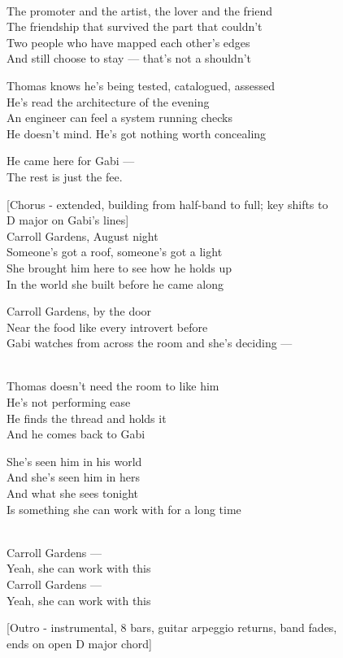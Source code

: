 \begin{lyrics}
\\
The promoter and the artist, the lover and the friend\\
The friendship that survived the part that couldn't\\
Two people who have mapped each other's edges\\
And still choose to stay — that's not a shouldn't

Thomas knows he's being tested, catalogued, assessed\\
He's read the architecture of the evening\\
An engineer can feel a system running checks\\
He doesn't mind. %
He's got nothing worth concealing

He came here for Gabi —\\
The rest is just the fee.

[Chorus - extended, building from half-band to full; key shifts to\\
D major on Gabi's lines]\\
Carroll Gardens, August night\\
Someone's got a roof, someone's got a light\\
She brought him here to see how he holds up\\
In the world she built before he came along

Carroll Gardens, by the door\\
Near the food like every introvert before\\
Gabi watches from across the room and she's deciding —

\\
Thomas doesn't need the room to like him\\
He's not performing ease\\
He finds the thread and holds it\\
And he comes back to Gabi

She's seen him in his world\\
And she's seen him in hers\\
And what she sees tonight\\
Is something she can work with for a long time

\\
Carroll Gardens —\\
Yeah, she can work with this\\
Carroll Gardens —\\
Yeah, she can work with this

[Outro - instrumental, 8 bars, guitar arpeggio returns, band fades,\\
ends on open D major chord]
\end{lyrics}

